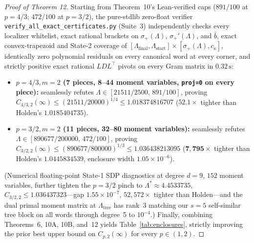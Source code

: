 \documentclass[10pt,letterpaper]{article}
\begin{document}
\begin{proof}[Proof of Theorem 12]
Starting from Theorem~10's Lean-verified caps ($891/100$ at $p = 4/3$; $472/100$ at $p = 3/2$), the pure-stdlib zero-float verifier \texttt{verify\_all\_exact\_certificates.py} (Suite~3) independently checks every localizer whitelist, exact rational brackets on $\sigma_+(\Lambda)$, $\sigma_+'(\Lambda)$, and $\bar{b}$, exact convex-trapezoid and State-2 coverage of $[\Lambda_{\mathrm{final}}, \Lambda_{\mathrm{start}}] \times [\sigma_+(\Lambda), c_\kappa]$, identically zero polynomial residuals on every canonical word at every corner, and strictly positive exact rational $LDL^\top$ pivots on every Gram matrix in $0.32\,\mathrm{s}$:
\begin{itemize}[leftmargin=1.5em,itemsep=1.5pt]
  \item \textbf{$p = 4/3, m = 2$ (7 pieces, 8--44 moment variables, \texttt{proj=0} on every piece):} seamlessly refutes $\Lambda \in [21511/2500,\, 891/100]$, proving $C_{4/3,2}(\infty) \le (21511/20000)^{1/4} \le 1.018374816707$ ($\mathbf{52.1\times}$ tighter than Holden's $1.0185404735$).
  \item \textbf{$p = 3/2, m = 2$ (11 pieces, 32--80 moment variables):} seamlessly refutes $\Lambda \in [890677/200000,\, 472/100]$, proving $C_{3/2,2}(\infty) \le (890677/800000)^{1/3} \le 1.036438213095$ ($\mathbf{7{,}795\times}$ tighter than Holden's $1.0445834539$, enclosure width $1.05\times 10^{-6}$).
\end{itemize}
(Numerical floating-point State-1 SDP diagnostics at degree $d = 9$, $152$ moment variables, further tighten the $p = 3/2$ pinch to $\Lambda^* \approx 4.4533735$, $C_{3/2,2} \le 1.036437323$—gap $1.55\times 10^{-7}$, $52{,}572\times$ tighter than Holden—and the dual primal moment matrix at $\Lambda_{\mathrm{tree}}$ has rank~$3$ matching our $s = 5$ self-similar tree block on all words through degree~5 to $10^{-4}$.) Finally, combining Theorems~6, 10A, 10B, and~12 yields Table~\ref{tab:enclosures}, strictly improving the prior best upper bound on $C_{p,2}(\infty)$ for every $p \in (1, 2)$.
\end{proof}
\end{document}
